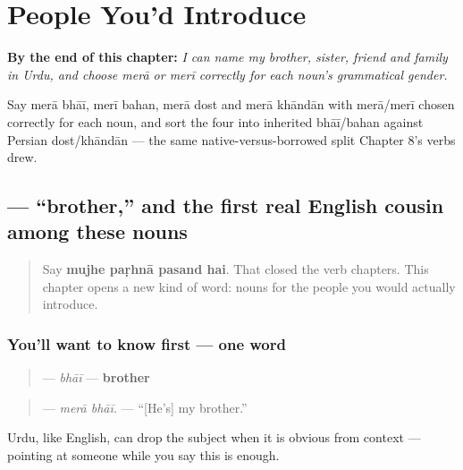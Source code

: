 
\chapter{People You'd Introduce}
\label{ch:ur-people}

\begin{chapteropening}
\textbf{By the end of this chapter:} \emph{I can name my brother, sister, friend and family in Urdu, and choose merā or merī correctly for each noun's grammatical gender.}

Say merā bhāī, merī bahan, merā dost and merā khāndān with merā/merī chosen correctly for each noun, and sort the four into inherited bhāī/bahan against Persian dost/khāndān — the same native-versus-borrowed split Chapter 8's verbs drew.
\end{chapteropening}

\section[\texorpdfstring{\ur{بھائی} (bhāī)}{بھائی (bhāī)}]{ — \textquotedblleft{}brother,\textquotedblright{} and the first real English cousin among these nouns}

\label{lesson:UR-C09-bhai}



\begin{quote}
Say \textbf{mujhe paṛhnā pasand hai}. That closed the verb chapters. This chapter opens a new kind of word: nouns for the people you would actually introduce.
\end{quote}

\subsection*{You'll want to know first — one word}
\begin{quote}
\textbf{} — \emph{bhāī} — \textbf{brother}
\end{quote}

\begin{quote}
\textbf{ } — \emph{merā bhāī.} — \textquotedblleft{}{[}He's{]} my brother.\textquotedblright{}
\end{quote}

Urdu, like English, can drop the subject when it is obvious from context — pointing at someone while you say this is enough.

